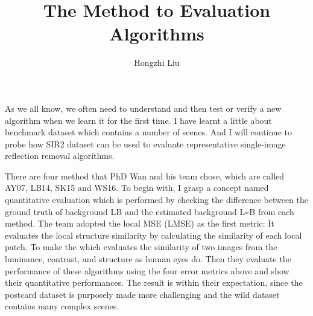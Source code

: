 \documentclass{article}
\author{Hongzhi Liu}
\title{The Method to Evaluation Algorithms}
\begin{document}
\maketitle
  \par
  As we all know, we often need to understand and then test or verify a new algorithm when we learn it for the first time. I have learnt a little about benchmark dataset which contains a number of scenes. And I will continue to probe how SIR2 dataset can be used to evaluate representative single-image reflection removal algorithms.

  There are four method that PhD Wan and his team
  chose, which are called AY07, LB14, SK15 and WS16. To begin with, I grasp a concept named quantitative evaluation which is performed by checking the difference between the ground truth of background LB and the estimated background L∗B from each method. The team adopted the local MSE (LMSE) as the first metric: It evaluates the local structure similarity by calculating the similarity of each local patch. To make the which evaluates the similarity of two images from the luminance, contrast, and structure as human eyes do. Then they evaluate the performance of these algorithms using the four error metrics above and show their quantitative performances. The result is within their expectation, since the postcard dataset is purposely made more challenging and the wild dataset contains many complex scenes.
\end{document}
